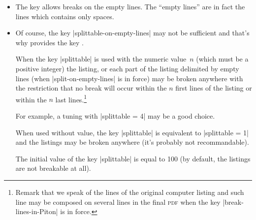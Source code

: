 \documentclass{article}
\begin{document}
\begin{itemize}
\item The key  allows breaks on the empty
lines. The ``empty lines'' are in fact the lines which contains only spaces.

\item Of course, the key |splittable-on-empty-lines| may not be sufficient and
that's why  provides the key .

When the key |splittable| is used with the numeric value~$n$ (which must be a
positive integer) the listing, or each part of the listing delimited by empty
lines (when |split-on-empty-lines| is in force) may be broken anywhere with
the restriction that no break will occur within the $n$ first lines of
the listing or within the $n$ last lines.\footnote{Remark that we speak of the
lines of the original computer listing and such line may be composed on
several lines in the final \textsc{pdf} when the key |break-lines-in-Piton| is
in force.} 

For example, a tuning with |splittable = 4| may be a good choice.

When used without value, the key |splittable| is equivalent to 
|splittable = 1| and the listings may be broken anywhere (it's probably 
not recommandable).

The initial value of the key |splittable| is equal to 100 (by default, the
listings are not breakable at all).
\end{itemize} 
\end{document}
